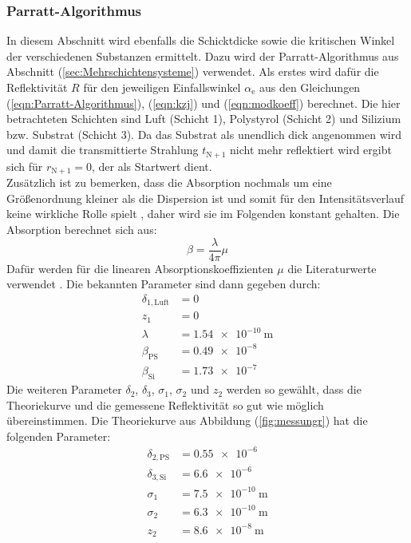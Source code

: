 \subsubsection{Parratt-Algorithmus}
In diesem Abschnitt wird ebenfalls die Schicktdicke sowie die kritischen Winkel der verschiedenen Substanzen ermittelt. Dazu wird der Parratt-Algorithmus aus Abschnitt (\ref{sec:Mehrschichtensysteme}) verwendet.
Als erstes wird dafür die Reflektivität $R$ für den jeweiligen Einfallswinkel $\alpha_\mathrm{e}$ aus den Gleichungen (\ref{eqn:Parratt-Algorithmus}), (\ref{eqn:kzj}) und (\ref{eqn:modkoeff}) berechnet.
Die hier betrachteten Schichten sind Luft (Schicht 1), Polystyrol (Schicht 2) und Silizium bzw. Substrat (Schicht 3).
Da das Substrat als unendlich dick angenommen wird und damit die transmittierte Strahlung $t_\mathrm{N+1}$ nicht mehr reflektiert wird ergibt sich für $r_\mathrm{N+1}=0$, der als Startwert dient. \\
\noindent Zusätzlich ist zu bemerken, dass die Absorption nochmals um eine Größenordnung kleiner als die Dispersion ist und somit für den Intensitätsverlauf keine wirkliche Rolle spielt \cite[34,35]{Anleitung6}, daher wird sie im Folgenden konstant gehalten. Die Absorption berechnet sich aus:
\begin{equation}
  \beta = \dfrac{\lambda}{4\pi}\mu
\end{equation}
Dafür werden für die linearen Absorptionskoeffizienten $\mu$ die Literaturwerte verwendet \cite[5]{Anleitung3}. Die bekannten Parameter sind dann gegeben durch:
\begin{align*}
  \delta_\mathrm{1,Luft}&=0 \\
  z_\mathrm{1}&=0 \\
  \lambda&=\SI{1.54 e-10}{\meter} \\
  \beta_\mathrm{PS}&=\SI{0.49 e-8}{} \\
  \beta_\mathrm{Si}&=\SI{1.73 e-7}{}
\end{align*}
Die weiteren Parameter $\delta_\mathrm{2}$, $\delta_\mathrm{3}$, $\sigma_\mathrm{1}$, $\sigma_\mathrm{2}$ und $z_\mathrm{2}$ werden so gewählt, dass die Theoriekurve und die gemessene Reflektivität so gut wie möglich übereinstimmen.
Die Theoriekurve aus Abbildung (\ref{fig:messungr}) hat die folgenden Parameter:
\begin{align*}
  \delta_\mathrm{2,PS} &=\SI{0.55 e-6}{} \\
  \delta_\mathrm{3,Si} &=\SI{6.6 e-6}{} \\
  \sigma_\mathrm{1} &=\SI{7.5 e-10}{\meter} \\
  \sigma_\mathrm{2} &=\SI{6.3 e-10}{\meter} \\
  z_\mathrm{2} &=\SI{8.6 e-8}{\meter}
\end{align*}
